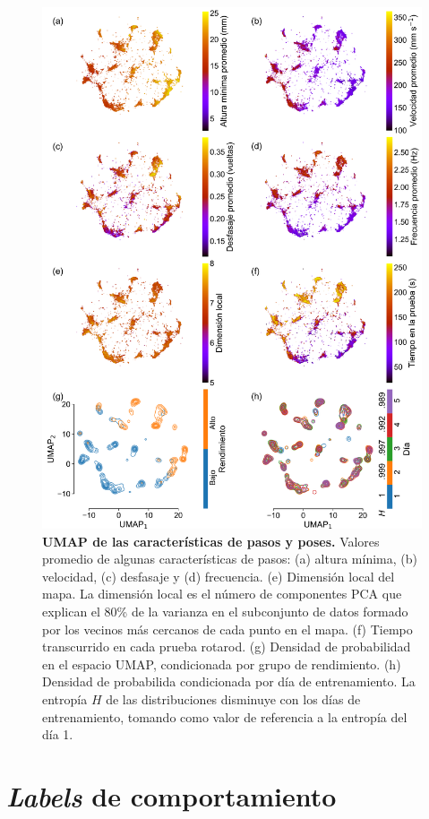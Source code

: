 \begin{appendix}
    \begin{figure}[htbp]
        \centering
        \includegraphics[width=0.9\linewidth]{figuras/capitulo4/umap_stp.png}
        \caption{\textbf{UMAP de las características de pasos y poses.} Valores promedio de algunas características de pasos: (a) altura mínima, (b) velocidad, (c) desfasaje y (d) frecuencia. (e) Dimensión local del mapa. La dimensión local es el número de componentes PCA que explican el 80\% de la varianza en el subconjunto de datos formado por los vecinos más cercanos de cada punto en el mapa. (f) Tiempo transcurrido en cada prueba rotarod. (g) Densidad de probabilidad  en el espacio UMAP, condicionada por grupo de rendimiento. (h) Densidad de probabilida condicionada por día de entrenamiento. La entropía $H$ de las distribuciones disminuye con los días de entrenamiento, tomando como valor de referencia a la entropía del día 1.}
        \label{fig:capitulo4_umap_stp}
    \end{figure}

    \clearpage

    \section{\textit{Labels} de comportamiento}\label{sec:apendice_labels}


\end{appendix}
